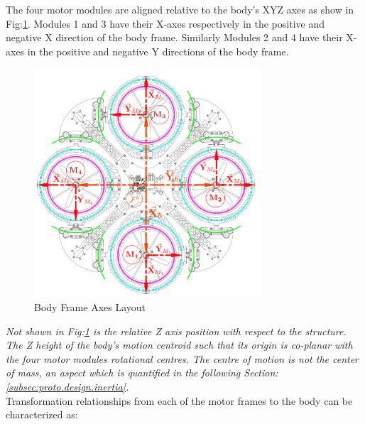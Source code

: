 \par
The four motor modules are aligned relative to the body's XYZ axes as show in Fig:\ref{fig:body-frame}. Modules 1 and 3 have their X-axes respectively in the positive and negative X direction of the body frame. Similarly Modules 2 and 4 have their X-axes in the positive and negative Y directions of the body frame.
\begin{figure}[htbp]
\centering
\includegraphics[width=0.75\textwidth]{figs/body-frame}
\caption{Body Frame Axes Layout}
\label{fig:body-frame}
\end{figure}
\par
\emph{\color{Gray}Not shown in Fig:\ref{fig:body-frame} is the relative Z axis position with respect to the structure. The Z height of the body's motion centroid such that its origin is co-planar with the four motor modules rotational centres. The centre of motion is not the center of mass, an aspect which is quantified in the following Section:\ref{subsec:proto.design.inertia}.}\\ Transformation relationships from each of the motor frames to the body can be characterized as:
